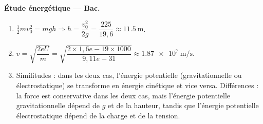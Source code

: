 \textbf{Étude énergétique — Bac.}
\begin{enumerate}
\item $\frac12 m v_0^2 = mgh \Rightarrow h = \dfrac{v_0^2}{2g} = \dfrac{225}{19,6} \approx \SI{11,5}{\metre}$.
\item $v = \sqrt{\dfrac{2eU}{m}} = \sqrt{\dfrac{2\times1,6e-19\times1000}{9,11e-31}} \approx \SI{1,87e7}{\metre\per\second}$.
\item Similitudes : dans les deux cas, l’énergie potentielle (gravitationnelle ou électrostatique) se transforme en énergie cinétique et vice versa. Différences : la force est conservative dans les deux cas, mais l’énergie potentielle gravitationnelle dépend de $g$ et de la hauteur, tandis que l’énergie potentielle électrostatique dépend de la charge et de la tension.
\end{enumerate}

\endinput